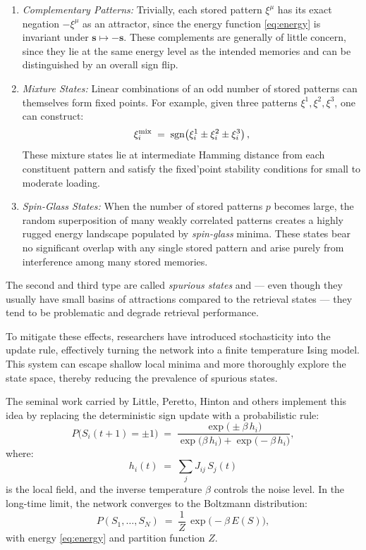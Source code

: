 \documentclass[a4paper,12pt]{report}
\begin{document}
\begin{enumerate}
  \item \emph{Complementary Patterns:}  
    Trivially, each stored pattern \(\xi^\mu\) has its exact negation \(-\xi^\mu\) as an 
    attractor, since the energy function \eqref{eq:energy} is invariant under 
    \(\mathbf{s}\mapsto -\mathbf{s}\).  These complements are generally of little 
    concern, since they lie at the same energy level as the intended memories and can 
    be distinguished by an overall sign flip.

  \item \emph{Mixture States:}\cite{PhysRevA.32.1007}
    Linear combinations of an odd number of stored patterns can themselves form fixed 
    points. For example, given three patterns \(\xi^1,\xi^2,\xi^3\), one can construct:
    \[
      \xi_i^{\rm mix} \;=\; \mathrm{sgn}\bigl(\xi_i^1 \pm \xi_i^2 \pm \xi_i^3\bigr)\,,
    \] 
    These mixture states lie at intermediate Hamming distance from each 
    constituent pattern and satisfy the fixed'point stability conditions for small to 
    moderate loading.

  \item \emph{Spin-Glass States:}\cite{PhysRevLett.55.1530}
    When the number of stored patterns \(p\) becomes large, the random superposition of 
    many weakly correlated patterns creates a highly rugged energy landscape populated 
    by {\em spin-glass} minima.  These states bear no significant overlap with any 
    single stored pattern and arise purely from interference among many stored memories.
\end{enumerate}
\vspace*{0.5em}

The second and third type are called \emph{spurious states} and --- even though they 
usually have small basins of attractions compared to the retrieval states --- they tend 
to be problematic and degrade retrieval performance.
\vspace{0.5em}

To mitigate these effects, researchers have introduced stochasticity into the update rule, 
effectively turning the network into a finite temperature Ising model.  
This system can escape shallow local minima and more thoroughly explore the state space, 
thereby reducing the prevalence of spurious states.

The seminal work carried by Little, Peretto, Hinton and others 
\cite{LITTLE1974101, Hinton1983, Peretto1984} implement this idea by replacing the 
deterministic sign update with a probabilistic rule:
\[
P\bigl(S_i(t+1) = \pm1\bigr)
\;=\;
\frac{\exp\bigl(\pm \beta\,h_i\bigr)}
     {\exp\bigl(\beta\,h_i\bigr) + \exp\bigl(-\beta\,h_i\bigr)},
\]
where:
\[
h_i(t) \;=\;\sum_{j} J_{ij}\,S_j(t)
\]
is the local field, and the inverse temperature \(\beta\) controls the noise level.  
In the long-time limit, the network converges to the Boltzmann distribution:
\[
P(S_1,\dots,S_N)
\;=\;
\frac{1}{Z}\,\exp\!\bigl(-\beta\,E(S)\bigr),
\]
with energy \ref{eq:energy} and partition function \(Z\).
\end{document}
